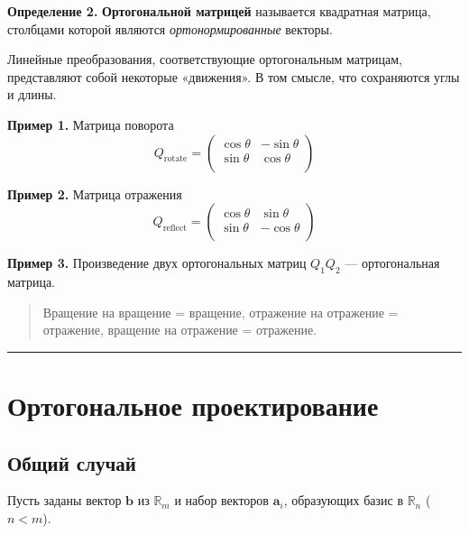 \documentclass[11pt,a4paper]{article}
\renewcommand{\linethickness}{0.1ex}
\begin{document}
\textbf{Определение 2.} \textbf{Ортогональной матрицей} называется
квадратная матрица, столбцами которой являются \emph{ортонормированные}
векторы.

Линейные преобразования, соответствующие ортогональным матрицам,
представляют собой некоторые «движения». В том смысле, что сохраняются
углы и длины.

\textbf{Пример 1.} Матрица поворота \[
  Q_\mathrm{rotate} = 
  \begin{pmatrix}
     \cos\theta & -\sin\theta \\
     \sin\theta &  \cos\theta \\
  \end{pmatrix}
\]

\textbf{Пример 2.} Матрица отражения \[
  Q_\mathrm{reflect} = 
  \begin{pmatrix}
     \cos\theta &  \sin\theta \\
     \sin\theta & -\cos\theta \\
  \end{pmatrix}
\]

\textbf{Пример 3.} Произведение двух ортогональных матриц \(Q_1 Q_2\)
--- ортогональная матрица.

\begin{quote}
Вращение на вращение = вращение, отражение на отражение = отражение,
вращение на отражение = отражение.
\end{quote}

    \begin{center}\rule{0.5\linewidth}{\linethickness}\end{center}

    \hypertarget{ux43eux440ux442ux43eux433ux43eux43dux430ux43bux44cux43dux43eux435-ux43fux440ux43eux435ux43aux442ux438ux440ux43eux432ux430ux43dux438ux435}{%
\section{Ортогональное
проектирование}\label{ux43eux440ux442ux43eux433ux43eux43dux430ux43bux44cux43dux43eux435-ux43fux440ux43eux435ux43aux442ux438ux440ux43eux432ux430ux43dux438ux435}}

\hypertarget{ux43eux431ux449ux438ux439-ux441ux43bux443ux447ux430ux439}{%
\subsection{Общий
случай}\label{ux43eux431ux449ux438ux439-ux441ux43bux443ux447ux430ux439}}

Пусть заданы вектор \(\mathbf{b}\) из \(\mathbb{R}_m\) и набор векторов
\(\mathbf{a}_i\), образующих базис в \(\mathbb{R}_n\) (\(n<m\)).
\end{document}
